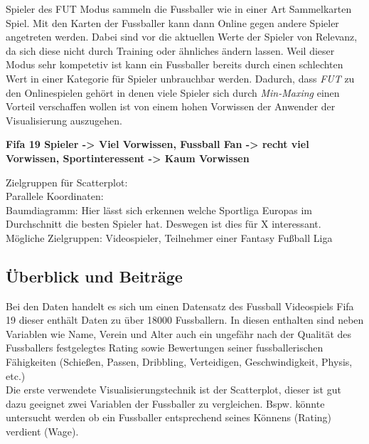 \documentclass[usegeometry=true]{scrartcl}
\begin{document}
Spieler des FUT Modus sammeln die Fussballer wie in einer Art Sammelkarten Spiel. Mit den Karten der Fussballer kann dann Online gegen andere Spieler angetreten werden. Dabei sind vor die aktuellen Werte der Spieler von Relevanz, da sich diese nicht durch Training oder ähnliches ändern lassen. Weil dieser Modus sehr kompetetiv ist kann ein Fussballer bereits durch einen schlechten Wert in einer Kategorie für Spieler unbrauchbar werden. Dadurch, dass \textit{FUT} zu den Onlinespielen gehört in denen viele Spieler sich durch \textit{Min-Maxing}\cite{noauthor_min-maxing_2014} einen Vorteil verschaffen wollen ist von einem hohen Vorwissen der Anwender der Visualisierung auszugehen.  




\textbf{Fifa 19 Spieler -> Viel Vorwissen, Fussball Fan -> recht viel Vorwissen, Sportinteressent -> Kaum Vorwissen}

Zielgruppen für Scatterplot:\\
Parallele Koordinaten:\\
Baumdiagramm: Hier lässt sich erkennen welche Sportliga Europas im Durchschnitt die besten Spieler hat. Deswegen ist dies für X interessant.\\
Mögliche Zielgruppen: Videospieler, Teilnehmer einer Fantasy Fußball Liga
\subsection{Überblick und Beiträge}



Bei den Daten handelt es sich um einen Datensatz des Fussball Videospiels Fifa 19 dieser enthält Daten zu über 18000 Fussballern. In diesen enthalten sind neben Variablen wie Name, Verein und Alter auch ein ungefähr nach der Qualität des Fussballers festgelegtes Rating sowie Bewertungen seiner fussballerischen Fähigkeiten (Schießen, Passen, Dribbling, Verteidigen, Geschwindigkeit, Physis, etc.)\\

Die erste verwendete Visualisierungstechnik ist der Scatterplot, dieser ist gut dazu geeignet zwei Variablen der Fussballer zu vergleichen. Bspw. könnte untersucht werden ob ein Fussballer entsprechend seines Könnens (Rating) verdient (Wage). \\
\end{document}
